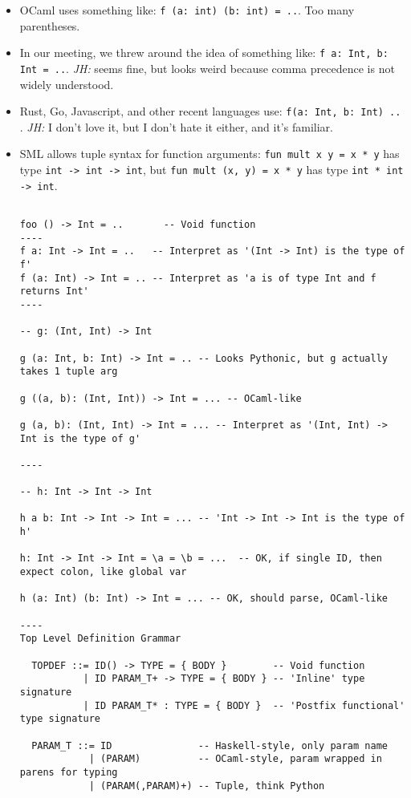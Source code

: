 \documentclass{article}
\begin{document}
\begin{itemize}
  \item OCaml uses something like: \verb|f (a: int) (b: int) = ..|. Too many
    parentheses.

  \item In our meeting, we threw around the idea of something like:
    \verb|f a: Int, b: Int = ..|. \textit{JH:} seems fine, but looks weird because comma
    precedence is not widely understood.

  \item Rust, Go, Javascript, and other recent languages use: \verb|f(a: Int, b: Int) .. |.
    \textit{JH:} I don't love it, but I don't hate it either, and it's familiar.

  \item SML allows tuple syntax for function arguments:
    \verb|fun mult x y = x * y| has type
    \verb|int -> int -> int|,
    but \verb|fun mult (x, y) = x * y| has type
    \verb|int * int -> int|.

\begin{verbatim}

foo () -> Int = ..       -- Void function
----
f a: Int -> Int = ..   -- Interpret as '(Int -> Int) is the type of f'
f (a: Int) -> Int = .. -- Interpret as 'a is of type Int and f returns Int'
----

-- g: (Int, Int) -> Int

g (a: Int, b: Int) -> Int = .. -- Looks Pythonic, but g actually takes 1 tuple arg

g ((a, b): (Int, Int)) -> Int = ... -- OCaml-like

g (a, b): (Int, Int) -> Int = ... -- Interpret as '(Int, Int) -> Int is the type of g'

----

-- h: Int -> Int -> Int

h a b: Int -> Int -> Int = ... -- 'Int -> Int -> Int is the type of h'

h: Int -> Int -> Int = \a = \b = ...  -- OK, if single ID, then expect colon, like global var

h (a: Int) (b: Int) -> Int = ... -- OK, should parse, OCaml-like 

----
Top Level Definition Grammar

  TOPDEF ::= ID() -> TYPE = { BODY }        -- Void function
           | ID PARAM_T+ -> TYPE = { BODY } -- 'Inline' type signature
           | ID PARAM_T* : TYPE = { BODY }  -- 'Postfix functional' type signature

  PARAM_T ::= ID               -- Haskell-style, only param name
            | (PARAM)          -- OCaml-style, param wrapped in parens for typing
            | (PARAM(,PARAM)+) -- Tuple, think Python


\end{verbatim}
\end{itemize}
\end{document}
